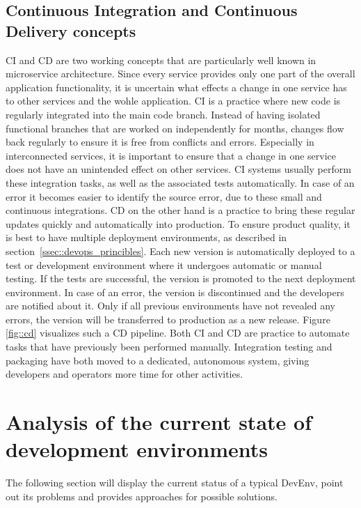 \documentclass[12pt, a4paper]{article}
\begin{document}
    \subsection{Continuous Integration and Continuous Delivery concepts}\label{ssec::ci_cd}
    \acl{CI} and \acl{CD} are two working concepts that are particularly well known in microservice architecture. Since every service provides only one part of the overall application functionality, it is uncertain what effects a change in one service has to other services and the wohle application.\newline
    \acl{CI} is a practice where new code is regularly integrated into the main code branch. Instead of having isolated functional branches that are worked on independently for months, changes flow back regularly to ensure it is free from conflicts and errors. Especially in interconnected services, it is important to ensure that a change in one service does not have an unintended effect on other services. \ac{CI} systems usually perform these integration tasks, as well as the associated tests automatically. In case of an error it becomes easier to identify the source error, due to these small and continuous integrations.\newline
    \acl{CD} on the other hand is a practice to bring these regular updates quickly and automatically into production. To ensure product quality, it is best to have multiple deployment environments, as described in section~\ref{ssec::devops_princibles}. Each new version is automatically deployed to a test or development environment where it undergoes automatic or manual testing. If the tests are successful, the version is promoted to the next deployment environment. In case of an error, the version is discontinued and the developers are notified about it. Only if all previous environments have not revealed any errors, the version will be transferred to production as a new release. Figure \ref{fig::cd} visualizes such a \ac{CD} pipeline. \newline
    Both \ac{CI} and \ac{CD} are practice to automate tasks that have previously been performed manually. Integration testing and packaging have both moved to a dedicated, autonomous system, giving developers and operators more time for other activities.
    

\section{Analysis of the current state of development environments}\label{sec::problem}
The following section will display the current status of a typical \ac{DevEnv}, point out its problems and provides approaches for possible solutions.
\end{document}
